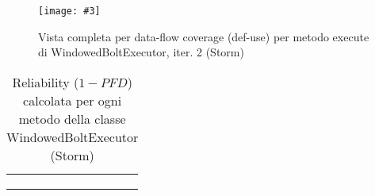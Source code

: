 \documentclass[10pt, a4paper]{article}
\newcommand{\Intmaketable}[4]{
	\begin{longtable}{#3}
	#4
	\caption{#2}
	\label{#1}
	\end{longtable}
}
\newcommand{\Intreltable}[3]{
	\Intmaketable{#1}{#2}{|l|l|l|l|l|l|l|}{
	\hline
	\thead{Metodo} & \thead{\# test totali} & \thead{\# test pass.} & \thead{\# test fail.} & \thead{Prof. op.} &
	\thead{Distribuzione} & \thead{Reliability}\\
	\hline
	\hline
	#3
	\hline}
}
\newcommand{\Intrelcaption}[2]{Reliability ($1-PFD$) calcolata per ogni metodo della classe #1 (#2)}
\newcommand{\gettablelabel}[5]{table:#1:#2:#3:iter#4:proj#5}
\newcommand{\getreltablelabel}[2]{\gettablelabel{#1}{}{}{}{#2}}
\newcommand{\reltable}[3] {
	\Intreltable{\getreltablelabel{#1}{#2}}
		{\Intrelcaption{#1}{#2}}
		{#3}
}
\newcommand{\unifdist}[1]{Uniforme: $#1$}
\newcommand{\getpicturelabel}[1]{picture:#1}
\newcommand{\makepicture}[4]{
	\begin{figure}[H]
	\centering
	\texttt{[image: \#3]}
	\caption{#4}
	\label{\getpicturelabel{#3}}
	\end{figure}
}
\newcommand{\alldfcovcaption}[4]{Vista completa per data-flow coverage (def-use) per metodo #1 di #2, iter. #3 (#4)}
\newcommand{\tcell}{\makecell[tl]}
\newcommand{\newtrow}{\\ \hline}
\def\storm{Storm}
\begin{document}
	\makepicture{15cm}{14cm}{storm/dataflow-execute-WindowedBoltExecutor-2}
				{\alldfcovcaption{execute}{WindowedBoltExecutor}{2}{\storm}}
	
	\reltable{WindowedBoltExecutor}{\storm} {
			\tcell{prepare} &
			\tcell{$25$} &
			\tcell{$24$} &
			\tcell{$1$} &
			\tcell{
				tabella $\ref{\gettablelabel{testc}{prepare}{WindowedBoltExecutor}{1}{\storm}}$,
				tabella $\ref{\gettablelabel{testc}{prepare}{WindowedBoltExecutor}{2}{\storm}}$} &
			\tcell{\unifdist{0.04}} &
			\tcell{$0.96$}
		\newtrow
			\tcell{execute} &
			\tcell{$15$} &
			\tcell{$14$} &
			\tcell{$1$} &
			\tcell{
				tabella $\ref{\gettablelabel{testc}{execute}{WindowedBoltExecutor}{1}{\storm}}$,
				tabella $\ref{\gettablelabel{testc}{execute}{WindowedBoltExecutor}{2}{\storm}}$} &
			\tcell{\unifdist{0.067}} &
			\tcell{$0.933$}
		\newtrow
	}
	
	
\end{document}
